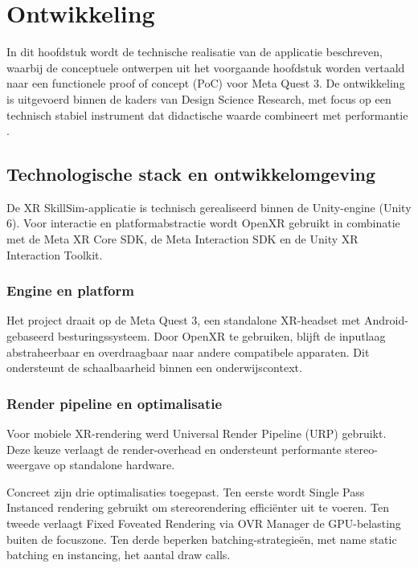 \chapter{Ontwikkeling}%
\label{ch:ontwikkeling}

In dit hoofdstuk wordt de technische realisatie van de applicatie beschreven, waarbij de conceptuele ontwerpen uit het voorgaande hoofdstuk worden vertaald naar een functionele proof of concept (PoC) voor Meta Quest 3. De ontwikkeling is uitgevoerd binnen de kaders van Design Science Research, met focus op een technisch stabiel instrument dat didactische waarde combineert met performantie \cite{Hevner2004, Peffers2007}.

\section{Technologische stack en ontwikkelomgeving}

De XR SkillSim-applicatie is technisch gerealiseerd binnen de Unity-engine (Unity 6). Voor interactie en platformabstractie wordt OpenXR gebruikt in combinatie met de Meta XR Core SDK, de Meta Interaction SDK en de Unity XR Interaction Toolkit.

\subsection{Engine en platform}

Het project draait op de Meta Quest 3, een standalone XR-headset met Android-gebaseerd besturingssysteem. Door OpenXR te gebruiken, blijft de inputlaag abstraheerbaar en overdraagbaar naar andere compatibele apparaten. Dit ondersteunt de schaalbaarheid binnen een onderwijscontext.

\subsection{Render pipeline en optimalisatie}

Voor mobiele XR-rendering werd Universal Render Pipeline (URP) gebruikt. Deze keuze verlaagt de render-overhead en ondersteunt performante stereo-weergave op standalone hardware.

Concreet zijn drie optimalisaties toegepast. Ten eerste wordt Single Pass Instanced rendering gebruikt om stereorendering efficiënter uit te voeren. Ten tweede verlaagt Fixed Foveated Rendering via OVR Manager de GPU-belasting buiten de focuszone. Ten derde beperken batching-strategieën, met name static batching en instancing, het aantal draw calls.

